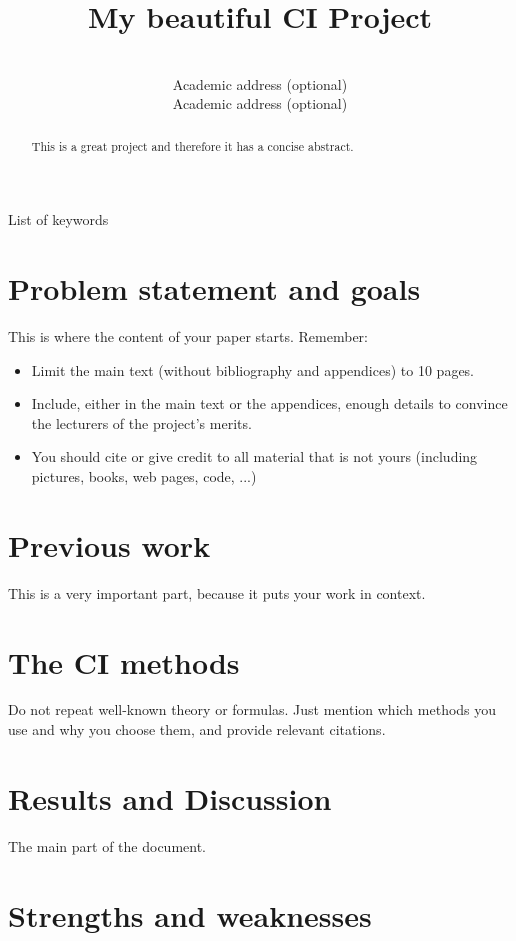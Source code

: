 \documentclass[anon]{CI}
\title[My CI Project]{My beautiful CI Project}
\author{\Name{Author Name1} \Email{abc@myemailaddress.com}\\
 \addr Academic address (optional)
 \AND
 \Name{Author Name2} \Email{xyz@myemailaddress.com}\\
 \addr Academic address (optional)
 }
\begin{document}
\maketitle

\begin{abstract}
This is a great project and therefore it has a concise abstract.
\end{abstract}

\begin{keywords}
List of keywords
\end{keywords}


\section{Problem statement and goals}

This is where the content of your paper starts. Remember:
\begin{itemize}
\item Limit the main text (without bibliography and appendices) to 10 pages.
\item Include, either in the main text or the appendices, enough details to convince the lecturers of the project's merits.
\item You should cite or give credit to all material that is not yours (including pictures, books, web pages, code, ...)
\end{itemize}

\section{Previous work}

This is a very important part, because it puts your work in context.

\section{The CI methods}

Do not repeat well-known theory or formulas. Just mention which methods you use and why you choose them, and provide relevant citations.

\section{Results and Discussion}

The main part of the document.

\section{Strengths and weaknesses}
\end{document}

